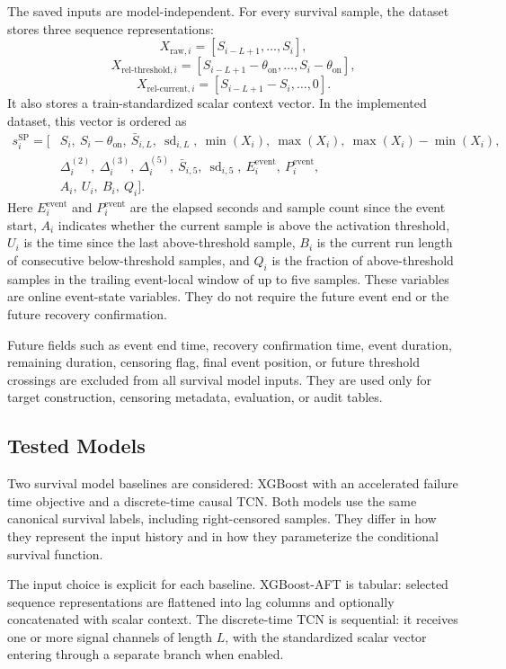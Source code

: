 The saved inputs are model-independent. For every survival sample, the dataset
stores three sequence representations:
\[
  X_{\text{raw},i}=[S_{i-L+1},\ldots,S_i],
\]
\[
  X_{\text{rel-threshold},i}
  =
  [S_{i-L+1}-\theta_{\text{on}},\ldots,S_i-\theta_{\text{on}}],
\]
\[
  X_{\text{rel-current},i}
  =
  [S_{i-L+1}-S_i,\ldots,0].
\]
It also stores a train-standardized scalar context vector. In the implemented
dataset, this vector is ordered as
\[
\begin{aligned}
  s_i^{\text{SP}} = [
  &S_i,\ S_i-\theta_{\text{on}},\
  \bar{S}_{i,L},\ \operatorname{sd}_{i,L},\
  \min(X_i),\ \max(X_i),\
  \max(X_i)-\min(X_i),\\
  &\Delta_i^{(2)},\ \Delta_i^{(3)},\ \Delta_i^{(5)},\
  \bar{S}_{i,5},\ \operatorname{sd}_{i,5},\
  E_i^{\text{event}},\ P_i^{\text{event}},\\
  &A_i,\ U_i,\ B_i,\ Q_i
  ] .
\end{aligned}
\]
Here \(E_i^{\text{event}}\) and \(P_i^{\text{event}}\) are the elapsed seconds
and sample count since the event start, \(A_i\) indicates whether the current
sample is above the activation threshold, \(U_i\) is the time since the last
above-threshold sample, \(B_i\) is the current run length of consecutive
below-threshold samples, and \(Q_i\) is the fraction of above-threshold samples
in the trailing event-local window of up to five samples. These variables are
online event-state variables. They do not require the future event end or the
future recovery confirmation.

Future fields such as event end time, recovery confirmation time, event
duration, remaining duration, censoring flag, final event position, or future
threshold crossings are excluded from all survival model inputs. They are used
only for target construction, censoring metadata, evaluation, or audit tables.

\subsection{Tested Models}
Two survival model baselines are considered: XGBoost with an accelerated failure
time objective and a discrete-time causal TCN. Both models use the same
canonical survival labels, including right-censored samples. They differ in how
they represent the input history and in how they parameterize the conditional
survival function.

The input choice is explicit for each baseline. XGBoost-AFT is tabular: selected
sequence representations are flattened into lag columns and optionally
concatenated with scalar context. The discrete-time TCN is sequential: it
receives one or more signal channels of length \(L\), with the standardized
scalar vector entering through a separate branch when enabled.


